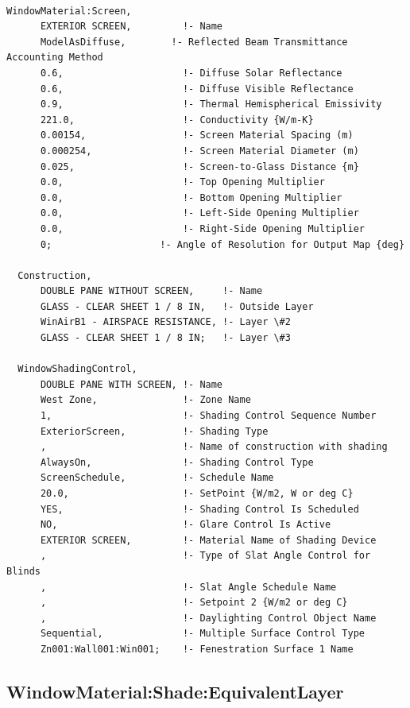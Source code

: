 \begin{lstlisting}

WindowMaterial:Screen,
      EXTERIOR SCREEN,         !- Name
      ModelAsDiffuse,        !- Reflected Beam Transmittance Accounting Method
      0.6,                     !- Diffuse Solar Reflectance
      0.6,                     !- Diffuse Visible Reflectance
      0.9,                     !- Thermal Hemispherical Emissivity
      221.0,                   !- Conductivity {W/m-K}
      0.00154,                 !- Screen Material Spacing (m)
      0.000254,                !- Screen Material Diameter (m)
      0.025,                   !- Screen-to-Glass Distance {m}
      0.0,                     !- Top Opening Multiplier
      0.0,                     !- Bottom Opening Multiplier
      0.0,                     !- Left-Side Opening Multiplier
      0.0,                     !- Right-Side Opening Multiplier
      0;                   !- Angle of Resolution for Output Map {deg}

  Construction,
      DOUBLE PANE WITHOUT SCREEN,     !- Name
      GLASS - CLEAR SHEET 1 / 8 IN,   !- Outside Layer
      WinAirB1 - AIRSPACE RESISTANCE, !- Layer \#2
      GLASS - CLEAR SHEET 1 / 8 IN;   !- Layer \#3

  WindowShadingControl,
      DOUBLE PANE WITH SCREEN, !- Name
      West Zone,               !- Zone Name
      1,                       !- Shading Control Sequence Number
      ExteriorScreen,          !- Shading Type
      ,                        !- Name of construction with shading
      AlwaysOn,                !- Shading Control Type
      ScreenSchedule,          !- Schedule Name
      20.0,                    !- SetPoint {W/m2, W or deg C}
      YES,                     !- Shading Control Is Scheduled
      NO,                      !- Glare Control Is Active
      EXTERIOR SCREEN,         !- Material Name of Shading Device
      ,                        !- Type of Slat Angle Control for Blinds
      ,                        !- Slat Angle Schedule Name
      ,                        !- Setpoint 2 {W/m2 or deg C}
      ,                        !- Daylighting Control Object Name
      Sequential,              !- Multiple Surface Control Type
      Zn001:Wall001:Win001;    !- Fenestration Surface 1 Name
\end{lstlisting}

\subsection{WindowMaterial:Shade:EquivalentLayer}\label{windowmaterialshadeequivalentlayer}


